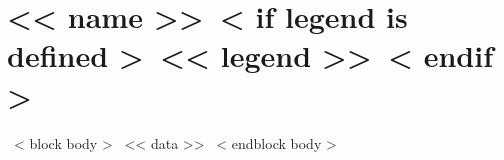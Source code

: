 \section{<< name >>~< if legend is defined >~\texorpdfstring{\hfill{\normalsize\normalfont<< legend >>}}{}~< endif >~}
  ~< block body >~
    << data >>
  ~< endblock body >~

